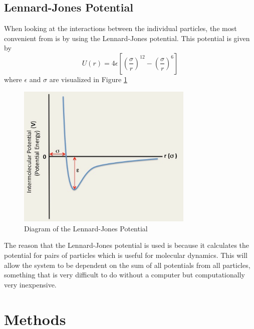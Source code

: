 \documentclass[letterpaper,12pt]{article}
\numberwithin{equation}{subsection}
\begin{document}
\subsection{Lennard-Jones Potential}
When looking at the interactions between the individual particles, the most convenient from is by using the Lennard-Jones potential. This potential is given by
\begin{equation}
U(r) = 4 \epsilon \left[ \left( \frac{\sigma}{r}\right)^{12} - \left( \frac{\sigma}{r}\right)^{6}\right]
\end{equation}
where $\epsilon$ and $\sigma$ are visualized in Figure \ref{fig:LJP}
\begin{figure}[H]
        \centering
        \caption{Diagram of the Lennard-Jones Potential \label{fig:LJP}}
                \centering
                \includegraphics[width=0.75\textwidth]{LJP.png}
\end{figure}
The reason that the Lennard-Jones potential is used is because it calculates the potential for pairs of particles which is useful for molecular dynamics. This will allow the system to be dependent on the sum of all potentials from all particles, something that is very difficult to do without a computer but computationally very inexpensive.

\newpage
\section{Methods}
\end{document}
